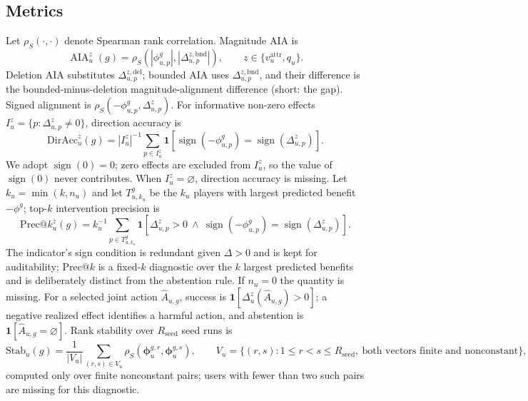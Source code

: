\documentclass[pdflatex,sn-mathphys-num]{sn-jnl}
\theoremstyle{thmstyleone}
\theoremstyle{thmstyletwo}
\theoremstyle{thmstylethree}
\newcommand{\AIA}{\operatorname{AIA}}
\begin{document}
\subsection{Metrics}
Let $\rho_S(\cdot,\cdot)$ denote Spearman rank correlation. Magnitude AIA is
\begin{equation}
\AIA_u^z(g)=\rho_S(|\phi^g_{u,p}|,|\Delta_{u,p}^{z,\mathrm{bnd}}|),\qquad z\in\{v_u^{\mathrm{attr}},q_u\}.
\label{eq:aia}
\end{equation}
Deletion AIA substitutes $\Delta_{u,p}^{z,\mathrm{del}}$; bounded AIA uses $\Delta_{u,p}^{z,\mathrm{bnd}}$, and their difference is the bounded-minus-deletion magnitude-alignment difference (short: the gap). Signed alignment is $\rho_S(-\phi^g_{u,p},\Delta_{u,p}^z)$. For informative non-zero effects $I_u^z=\{p:\Delta_{u,p}^z\ne0\}$, direction accuracy is
\begin{equation}
\mathrm{DirAcc}_u^z(g)=|I_u^z|^{-1}\sum_{p\in I_u^z}\mathbf{1}\left[\operatorname{sign}(-\phi^g_{u,p})=\operatorname{sign}(\Delta_{u,p}^z)\right].
\end{equation}
We adopt $\operatorname{sign}(0)=0$; zero effects are excluded from $I_u^z$, so the value of $\operatorname{sign}(0)$ never contributes. When $I_u^z=\varnothing$, direction accuracy is missing. Let $k_u=\min(k,n_u)$ and let $T_{u,k_u}^g$ be the $k_u$ players with largest predicted benefit $-\phi^g$; top-$k$ intervention precision is
\begin{equation}
\mathrm{Prec}@k_u^z(g)=k_u^{-1}\sum_{p\in T_{u,k_u}^g}\mathbf{1}\left[\Delta_{u,p}^z>0\ \wedge\ \operatorname{sign}(-\phi^g_{u,p})=\operatorname{sign}(\Delta_{u,p}^z)\right].
\end{equation}
The indicator's sign condition is redundant given $\Delta>0$ and is kept for auditability; $\mathrm{Prec}@k$ is a fixed-$k$ diagnostic over the $k$ largest predicted benefits and is deliberately distinct from the abstention rule. If $n_u=0$ the quantity is missing. For a selected joint action $\widehat A_{u,g}$, success is $\mathbf{1}[\Delta_u^z(\widehat A_{u,g})>0]$; a negative realized effect identifies a harmful action, and abstention is $\mathbf{1}[\widehat A_{u,g}=\varnothing]$. Rank stability over $R_{\mathrm{seed}}$ seed runs is
\begin{equation}
\mathrm{Stab}_u(g)=\frac{1}{|V_u|}\sum_{(r,s)\in V_u}\rho_S(\boldsymbol\phi_{u}^{g,r},\boldsymbol\phi_{u}^{g,s}),\qquad V_u=\{(r,s):1\le r<s\le R_{\mathrm{seed}},\ \text{both vectors finite and nonconstant}\},
\end{equation}
computed only over finite nonconstant pairs; users with fewer than two such pairs are missing for this diagnostic.
\end{document}
